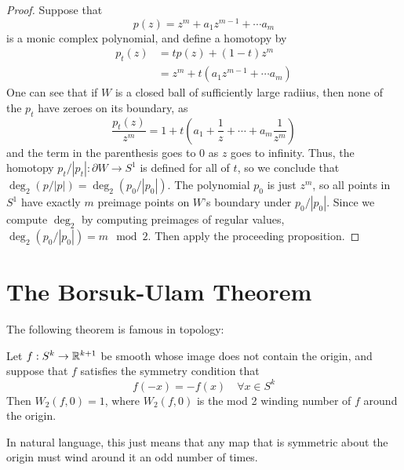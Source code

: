 \begin{proof}
    Suppose that 
    \[p(z) = z^m + a_1z^{m-1} + \cdots a_m\]
    is a monic complex polynomial, and define a homotopy by 
    \begin{align*}
        p_t(z) & = tp(z) + (1-t)z^m \\
               & = z^m + t(a_1z^{m-1} + \cdots a_m)
    \end{align*}
    One can see that if $W$ is a closed ball of sufficiently large radiius, then none of the $p_t$ have zeroes on its boundary, as 
    \[\frac{p_t(z)}{z^m} = 1 + t\left(a_1 + \frac{1}{z} + \cdots + a_m \frac{1}{z^m}\right)\]
    and the term in the parenthesis goes to 0 as $z$ goes to infinity. Thus, the homotopy $p_t/|p_t|: \partial W \to S^1$ is defined for all of $t$, so we conclude that $\deg_2(p/|p|) = \deg_2(p_0/|p_0|)$. The polynomial $p_0$ is just $z^m$, so all points in $S^1$ have exactly $m$ preimage points on $W$'s boundary under $p_0/|p_0|$. Since we compute $\deg_2$ by computing preimages of regular values, $\deg_2(p_0/|p_0|) = m \mod{2}$. Then apply the proceeding proposition. 
\end{proof}

\section{The Borsuk-Ulam Theorem}

The following theorem is famous in topology:

\begin{theorem}
    Let $f: S^k \to \mathbb{R}^{k+1}$ be smooth whose image does not contain the origin, and suppose that $f$ satisfies the symmetry condition that 
    \[f(-x) = -f(x) \quad \forall x \in S^k\]
    Then $W_2(f,0) = 1$, where $W_2(f,0)$ is the mod 2 winding number of $f$ around the origin. 
\end{theorem}

In natural language, this just means that any map that is symmetric about the origin must wind around it an odd number of times. 

